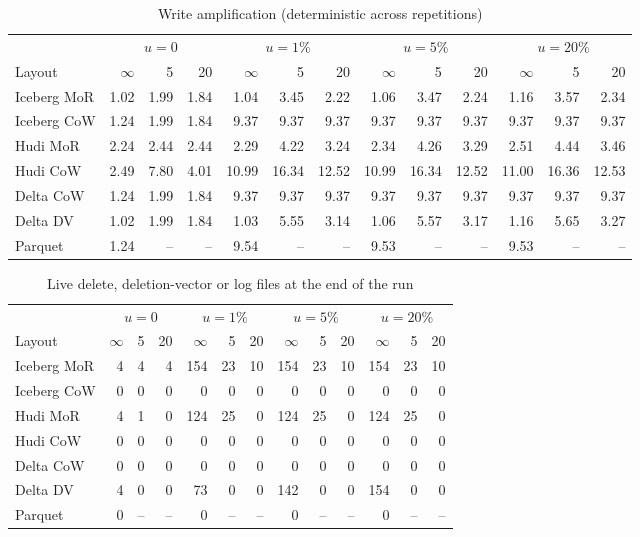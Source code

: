 \documentclass[conference]{IEEEtran}
\begin{document}
\begin{table}[!t]\centering
\caption{Write amplification (deterministic across repetitions)}\label{tab:a-wa}
\footnotesize
\begin{tabular}{@{}lrrrrrrrrrrrr@{}}\toprule
 & \multicolumn{3}{c}{$u=0$} & \multicolumn{3}{c}{$u=1\%$} & \multicolumn{3}{c}{$u=5\%$} & \multicolumn{3}{c}{$u=20\%$}\\
\cmidrule(lr){2-4}\cmidrule(lr){5-7}\cmidrule(lr){8-10}\cmidrule(lr){11-13}
Layout & $\infty$ & 5 & 20 & $\infty$ & 5 & 20 & $\infty$ & 5 & 20 & $\infty$ & 5 & 20\\\midrule
Iceberg MoR & 1.02 & 1.99 & 1.84 & 1.04 & 3.45 & 2.22 & 1.06 & 3.47 & 2.24 & 1.16 & 3.57 & 2.34\\
Iceberg CoW & 1.24 & 1.99 & 1.84 & 9.37 & 9.37 & 9.37 & 9.37 & 9.37 & 9.37 & 9.37 & 9.37 & 9.37\\
Hudi MoR & 2.24 & 2.44 & 2.44 & 2.29 & 4.22 & 3.24 & 2.34 & 4.26 & 3.29 & 2.51 & 4.44 & 3.46\\
Hudi CoW & 2.49 & 7.80 & 4.01 & 10.99 & 16.34 & 12.52 & 10.99 & 16.34 & 12.52 & 11.00 & 16.36 & 12.53\\
Delta CoW & 1.24 & 1.99 & 1.84 & 9.37 & 9.37 & 9.37 & 9.37 & 9.37 & 9.37 & 9.37 & 9.37 & 9.37\\
Delta DV & 1.02 & 1.99 & 1.84 & 1.03 & 5.55 & 3.14 & 1.06 & 5.57 & 3.17 & 1.16 & 5.65 & 3.27\\
Parquet & 1.24 & -- & -- & 9.54 & -- & -- & 9.53 & -- & -- & 9.53 & -- & --\\\bottomrule
\end{tabular}
\end{table}

\begin{table}[!t]\centering
\caption{Live delete, deletion-vector or log files at the end of the run}\label{tab:a-del}
\footnotesize
\begin{tabular}{@{}lrrrrrrrrrrrr@{}}\toprule
 & \multicolumn{3}{c}{$u=0$} & \multicolumn{3}{c}{$u=1\%$} & \multicolumn{3}{c}{$u=5\%$} & \multicolumn{3}{c}{$u=20\%$}\\
\cmidrule(lr){2-4}\cmidrule(lr){5-7}\cmidrule(lr){8-10}\cmidrule(lr){11-13}
Layout & $\infty$ & 5 & 20 & $\infty$ & 5 & 20 & $\infty$ & 5 & 20 & $\infty$ & 5 & 20\\\midrule
Iceberg MoR & 4 & 4 & 4 & 154 & 23 & 10 & 154 & 23 & 10 & 154 & 23 & 10\\
Iceberg CoW & 0 & 0 & 0 & 0 & 0 & 0 & 0 & 0 & 0 & 0 & 0 & 0\\
Hudi MoR & 4 & 1 & 0 & 124 & 25 & 0 & 124 & 25 & 0 & 124 & 25 & 0\\
Hudi CoW & 0 & 0 & 0 & 0 & 0 & 0 & 0 & 0 & 0 & 0 & 0 & 0\\
Delta CoW & 0 & 0 & 0 & 0 & 0 & 0 & 0 & 0 & 0 & 0 & 0 & 0\\
Delta DV & 4 & 0 & 0 & 73 & 0 & 0 & 142 & 0 & 0 & 154 & 0 & 0\\
Parquet & 0 & -- & -- & 0 & -- & -- & 0 & -- & -- & 0 & -- & --\\\bottomrule
\end{tabular}
\end{table}
\end{document}
